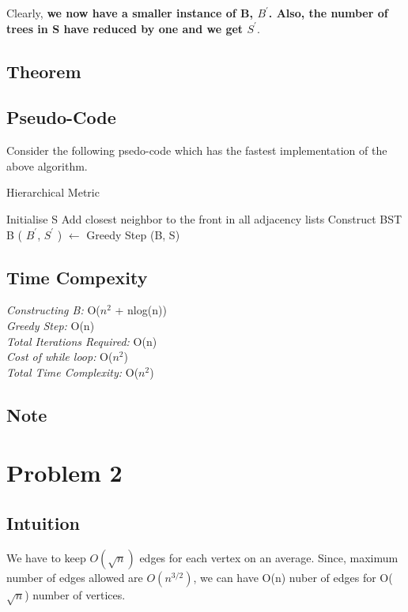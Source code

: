 \documentclass{article}
\begin{document}
Clearly, \textbf{we now have a smaller instance of B, \emph{$B^{'}$}. Also, the number of trees in S have reduced by one and we get \emph{$S^{'}$}}.
\newpage

\subsection{Theorem}

\subsection{Pseudo-Code}
Consider the following psedo-code which has the fastest implementation of the above algorithm.
\begin{algorithm}
\caption{Hierarchical Metric}
\label{hm}
\begin{algorithmic}[1]
\State Initialise S 
\State Add closest neighbor to the front in all adjacency lists  
\State Construct BST B  
  
\State ( $B^{'}$, $S^{'}$ ) $\gets$ Greedy Step (B, S)  
\EndWhile
\EndProcedure
\end{algorithmic}
\end{algorithm}

\subsection{Time Compexity}
\emph{Constructing B:} O($n^2$ + nlog(n))\\
\emph{Greedy Step:} O(n)\\
\emph{Total Iterations Required:} O(n)\\
\emph{Cost of while loop:} O($n^2$)\\
\emph{Total Time Complexity: } O($n^2$)

\subsection{Note}

\section{Problem 2}
\subsection{Intuition}
We have to keep $O(\sqrt{n})$ edges for each vertex on an average. Since, maximum number of edges allowed are $O(n^{3/2})$, we can have O(n) nuber of edges for O($\sqrt{n}$) number of vertices.
\end{document}
